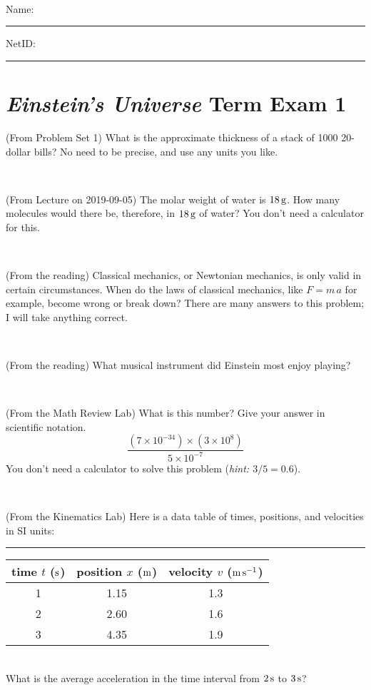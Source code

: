 \documentclass[12pt, letterpaper]{article}
\begin{document}
\vfill ~


\cleardoublepage



\noindent
Name: \rule[-1ex]{0.60\textwidth}{0.1pt}
NetID: \rule[-1ex]{0.20\textwidth}{0.1pt}

\section*{\textsl{Einstein's Universe} Term Exam 1}
\setcounter{problem}{1}


\begin{problem} (From Problem Set 1)
What is the approximate thickness of a stack of 1000 20-dollar bills?
No need to be precise, and use any units you like.
\end{problem}


\vfill ~

\begin{problem} (From Lecture on 2019-09-05)
The molar weight of water is $18\,\mathrm{g}$. How many molecules would there
be, therefore, in $18\,\mathrm{g}$ of water? You don't need a calculator for
this.
\end{problem}


\vfill ~

\begin{problem} (From the reading)
Classical mechanics, or Newtonian mechanics, is only valid in certain
circumstances. When do the laws of classical mechanics, like $F =
m\,a$ for example, become wrong or break down? There are many answers
to this problem; I will take anything correct.
\end{problem}


\vfill ~

\begin{problem} (From the reading)
What musical instrument did Einstein most enjoy playing?
\end{problem}


\vfill ~


\clearpage


\begin{problem} (From the Math Review Lab)
What is this number? Give your answer in scientific notation.
$$
\frac{(7\times10^{-34})\times(3\times10^8)}{5\times10^{-7}}
$$
You don't need a calculator to solve this problem (\textit{hint: $3/5=0.6$}).
\end{problem}


\vfill ~

\begin{problem} (From the Kinematics Lab)
Here is a data table of times, positions, and velocities in SI units:\\
\rule{1.0in}{0pt}\begin{tabular}{c|c|c}
time $t$ ($\mathrm{s}$) & position $x$ ($\mathrm{m}$) & velocity $v$ ($\mathrm{m}\,\mathrm{s}^{-1}$) \\
\hline
1 & 1.15 & 1.3 \\
2 & 2.60 & 1.6 \\
3 & 4.35 & 1.9 \\
\hline
\end{tabular}\\
What is the average acceleration in the time interval from $2\,\mathrm{s}$ to $3\,\mathrm{s}$?
\end{problem}
\end{document}

